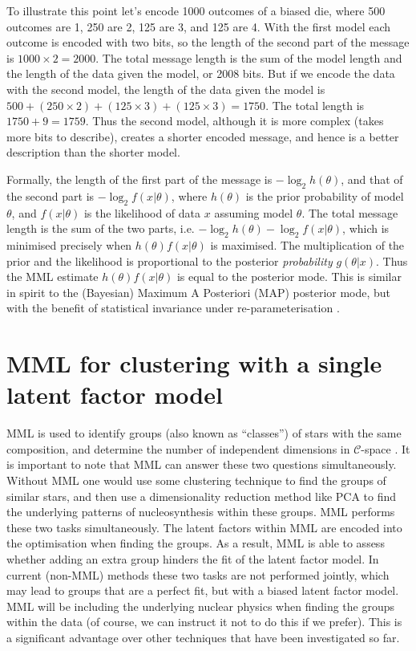 \documentclass{elsarticle}
\newcommand{\Cspace}{$\mathcal{C}$-space }
\begin{document}
To illustrate this point let's encode 1000 outcomes of a biased die, 
where 500 outcomes are 1, 250 are 2, 125 are 3, and 125 are 4.
With the first model each outcome is encoded with two bits,
so the length of the second part of the message is $1000\times 2=2000$.
The total message length is the sum of the model length 
and the length of the data given the model, or 2008 bits. 
But if we encode the data with the second model,
the length of the data given the model is 
$ 500+(250\times2)+(125\times3)+(125\times3)=1750$.
The total length is $1750+9=1759$. Thus the second model, 
although it is more complex (takes more bits to describe), creates a shorter encoded message, 
and hence is a better description than the shorter model.

Formally, the length of the first part of the message is
$- \log_2h(\theta)$, and that
of the second part is
$- \log_2f(x|\theta)$,
where $h(\theta)$ is the prior probability of model $\theta$,
and $f(x|\theta)$ is the likelihood of data $x$ assuming model $\theta$.
The total message length is the sum of the two parts,
i.e. $- \log_2h(\theta) - \log_2f(x|\theta)$,
which is minimised precisely when $h(\theta)f(x|\theta)$ is maximised. The multiplication of the prior and the likelihood is proportional to the posterior {\em probability} $g(\theta|x)$. Thus the MML estimate $h(\theta)f(x|\theta)$ is equal to the posterior mode.
This is similar in spirit to the (Bayesian) Maximum A Posteriori (MAP) posterior mode, but with the
benefit of statistical invariance under re-parameterisation \cite{Dowe07GO}.


\section{MML for clustering with a single latent factor model}
MML is used to identify groups (also known as ``classes'') of stars with the  same composition, and determine the number of independent dimensions in \Cspace. It is important to note that MML can answer these two questions simultaneously. Without MML one would use some clustering 
technique to find the groups of similar stars, and then use a dimensionality reduction method  like PCA to find the underlying patterns of nucleosynthesis within these groups. MML performs these two tasks simultaneously. The latent factors within MML are encoded into the optimisation when finding the groups. As a result, MML is able to assess whether adding an extra group
hinders the fit of the latent factor model. In current (non-MML) methods these two tasks are not performed jointly, which may lead to groups that are a perfect fit, but with a biased latent factor model. MML will be including the underlying nuclear physics when finding the groups within the data
(of course, we can instruct it not to do this if we prefer). This is a significant advantage over other techniques that have been investigated so far.
\end{document}
